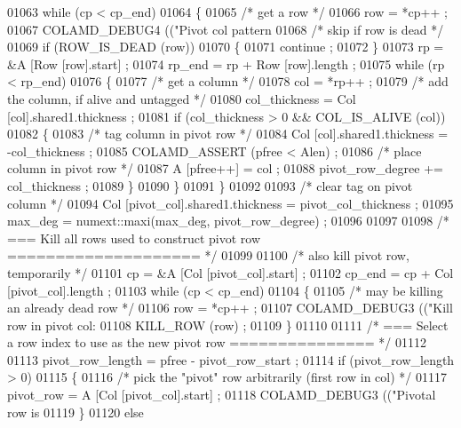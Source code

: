 \begin{DoxyCode}
{{{{{{{{{{{{{{{{{{{01063     \textcolor{keywordflow}{while} (cp < cp\_end)
01064     \{
01065       \textcolor{comment}{/* get a row */}
01066       row = *cp++ ;
01067       COLAMD\_DEBUG4 ((\textcolor{stringliteral}{"Pivot col pattern %
01068       \textcolor{comment}{/* skip if row is dead */}
01069       \textcolor{keywordflow}{if} (ROW\_IS\_DEAD (row))
01070       \{
01071     continue ;
01072       \}
01073       rp = &A [Row [row].start] ;
01074       rp\_end = rp + Row [row].length ;
01075       \textcolor{keywordflow}{while} (rp < rp\_end)
01076       \{
01077     \textcolor{comment}{/* get a column */}
01078     col = *rp++ ;
01079     \textcolor{comment}{/* add the column, if alive and untagged */}
01080     col\_thickness = Col [col].shared1.thickness ;
01081     \textcolor{keywordflow}{if} (col\_thickness > 0 && COL\_IS\_ALIVE (col))
01082     \{
01083       \textcolor{comment}{/* tag column in pivot row */}
01084       Col [col].shared1.thickness = -col\_thickness ;
01085       COLAMD\_ASSERT (pfree < Alen) ;
01086       \textcolor{comment}{/* place column in pivot row */}
01087       A [pfree++] = col ;
01088       pivot\_row\_degree += col\_thickness ;
01089     \}
01090       \}
01091     \}
01092 
01093     \textcolor{comment}{/* clear tag on pivot column */}
01094     Col [pivot\_col].shared1.thickness = pivot\_col\_thickness ;
01095     max\_deg = numext::maxi(max\_deg, pivot\_row\_degree) ;
01096 
01097 
01098     \textcolor{comment}{/* === Kill all rows used to construct pivot row ==================== */}
01099 
01100     \textcolor{comment}{/* also kill pivot row, temporarily */}
01101     cp = &A [Col [pivot\_col].start] ;
01102     cp\_end = cp + Col [pivot\_col].length ;
01103     \textcolor{keywordflow}{while} (cp < cp\_end)
01104     \{
01105       \textcolor{comment}{/* may be killing an already dead row */}
01106       row = *cp++ ;
01107       COLAMD\_DEBUG3 ((\textcolor{stringliteral}{"Kill row in pivot col: %
01108       KILL\_ROW (row) ;
01109     \}
01110 
01111     \textcolor{comment}{/* === Select a row index to use as the new pivot row =============== */}
01112 
01113     pivot\_row\_length = pfree - pivot\_row\_start ;
01114     \textcolor{keywordflow}{if} (pivot\_row\_length > 0)
01115     \{
01116       \textcolor{comment}{/* pick the "pivot" row arbitrarily (first row in col) */}
01117       pivot\_row = A [Col [pivot\_col].start] ;
01118       COLAMD\_DEBUG3 ((\textcolor{stringliteral}{"Pivotal row is %
01119     \}
01120     \textcolor{keywordflow}{else}
}}}}}}}}}}}}}}}}}}}}}}
\end{DoxyCode}
